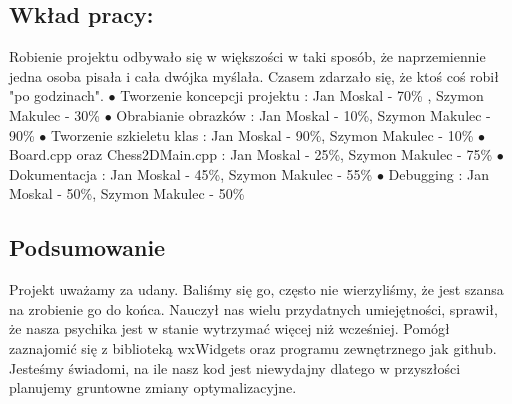 \documentclass[]{report}
\begin{document}
\begin{flushleft}
\subsection*{Wkład pracy:}
\vspace{\baselineskip}
Robienie projektu odbywało się w większości w taki sposób, że naprzemiennie jedna osoba pisała i cała dwójka myślała. Czasem zdarzało się, że ktoś coś robił "po godzinach".
\vspace{\baselineskip}
\newline
$\bullet$ Tworzenie koncepcji projektu : Jan Moskal - 70\% , Szymon Makulec - 30\%\newline
$\bullet$ Obrabianie obrazków : Jan Moskal - 10\%, Szymon Makulec - 90\%\newline
$\bullet$ Tworzenie szkieletu klas : Jan Moskal - 90\%, Szymon Makulec - 10\%\newline
$\bullet$ Board.cpp oraz Chess2DMain.cpp : Jan Moskal - 25\%, Szymon Makulec - 75\%\newline
$\bullet$ Dokumentacja : Jan Moskal - 45\%, Szymon Makulec - 55\%\newline
$\bullet$ Debugging : Jan Moskal - 50\%, Szymon Makulec - 50\%\newline

\subsection*{Podsumowanie}
Projekt uważamy za udany. Baliśmy się go, często nie wierzyliśmy, że jest szansa na zrobienie go do końca. Nauczył nas wielu przydatnych umiejętności, sprawił, że nasza psychika jest w stanie wytrzymać więcej niż wcześniej. Pomógł zaznajomić się z biblioteką wxWidgets oraz programu zewnętrznego jak github. Jesteśmy świadomi, na ile nasz kod jest niewydajny dlatego w przyszłości planujemy gruntowne zmiany optymalizacyjne.
\end{flushleft}
\end{document}
